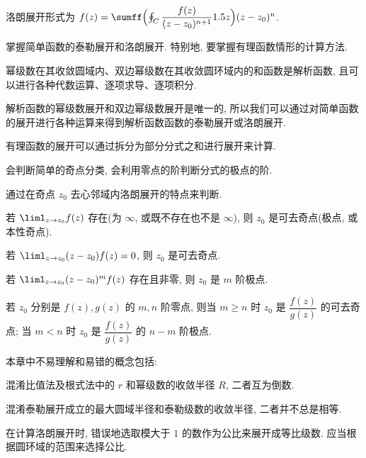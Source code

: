 \begin{conclusion}
\begin{conclusion}
    \item 洛朗展开形式为 $f(z)=\sumff \Bigl(\oint_C\dfrac{f(z)}{(z-z_0)^{n+1}}\d z\Bigr)(z-z_0)^n$.
  \end{conclusion}
  \item 掌握简单函数的泰勒展开和洛朗展开. 特别地, 要掌握有理函数情形的计算方法.
  \begin{conclusion}
    \item 幂级数在其收敛圆域内、双边幂级数在其收敛圆环域内的和函数是解析函数, 且可以进行各种代数运算、逐项求导、逐项积分.
    \item 解析函数的幂级数展开和双边幂级数展开是唯一的, 所以我们可以通过对简单函数的展开进行各种运算来得到解析函数函数的泰勒展开或洛朗展开.
    \item 有理函数的展开可以通过拆分为部分分式之和进行展开来计算.
  \end{conclusion}
  \item 会判断简单的奇点分类, 会利用零点的阶判断分式的极点的阶.
  \begin{conclusion}
    \item 通过在奇点 $z_0$ 去心邻域内洛朗展开的特点来判断.
    \item 若 $\liml_{z\ra z_0} f(z)$ 存在(为 $\infty$, 或既不存在也不是 $\infty$), 则 $z_0$ 是可去奇点(极点, 或本性奇点).
    \item 若 $\liml_{z\ra z_0} (z-z_0)f(z)=0$, 则 $z_0$ 是可去奇点.
    \item 若 $\liml_{z\ra z_0} (z-z_0)^mf(z)$ 存在且非零, 则 $z_0$ 是 $m$ 阶极点.
    \item 若 $z_0$ 分别是 $f(z),g(z)$ 的 $m,n$ 阶零点, 则当 $m\ge n$ 时 $z_0$ 是 $\dfrac{f(z)}{g(z)}$ 的可去奇点; 当 $m<n$ 时 $z_0$ 是 $\dfrac{f(z)}{g(z)}$ 的 $n-m$ 阶极点.
  \end{conclusion}
\end{conclusion}

本章中不易理解和易错的概念包括:
\begin{enuma}
  \item 混淆比值法及根式法中的 $r$ 和幂级数的收敛半径 $R$, 二者互为倒数.
  \item 混淆泰勒展开成立的最大圆域半径和泰勒级数的收敛半径, 二者并不总是相等.
  \item 在计算洛朗展开时, 错误地选取模大于 $1$ 的数作为公比来展开成等比级数. 应当根据圆环域的范围来选择公比.
\end{enuma}



